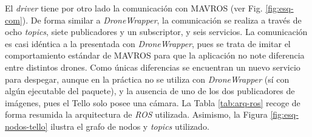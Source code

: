 \documentclass[../main.tex]{subfiles}
\begin{document}
El \emph{driver} tiene por otro lado la comunicación con MAVROS (ver Fig. \ref{fig:esq-com}). De forma similar a \emph{DroneWrapper}, la comunicación se realiza a través de ocho \emph{topics}, siete publicadores y un subscriptor, y seis servicios. La comunicación es casi idéntica a la presentada con \emph{DroneWrapper}, pues se trata de imitar el comportamiento estándar de MAVROS para que la aplicación no note diferencia entre distintos drones. Como únicas diferencias se encuentran un nuevo servicio para despegar, aunque en la práctica no se utiliza con \emph{DroneWrapper} (sí con algún ejecutable del paquete), y la ausencia de uno de los dos publicadores de imágenes, pues el Tello solo posee una cámara. La Tabla \ref{tab:arq-ros} recoge de forma resumida la arquitectura de \emph{ROS} utilizada. Asimismo, la Figura \ref{fig:esq-nodos-tello} ilustra el grafo de nodos y \emph{topics} utilizado.
\end{document}
